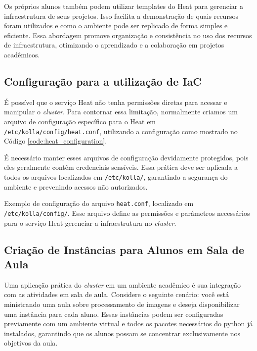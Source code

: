 Os próprios alunos também podem utilizar templates do Heat para gerenciar a infraestrutura de seus projetos. Isso facilita a demonstração de quais recursos foram utilizados e como o ambiente pode ser replicado de forma simples e eficiente. Essa abordagem promove organização e consistência no uso dos recursos de infraestrutura, otimizando o aprendizado e a colaboração em projetos acadêmicos.

\subsection{Configuração para a utilização de IaC}
É possível que o serviço Heat não tenha permissões diretas para acessar e manipular o \textit{cluster}. Para contornar essa limitação, normalmente criamos um arquivo de configuração específico para o Heat em \texttt{/etc/kolla/config/heat.conf}, utilizando a configuração como mostrado no Código \ref{code:heat_configuration}.

É necessário manter esses arquivos de configuração devidamente protegidos, pois eles geralmente contêm credenciais sensíveis. Essa prática deve ser aplicada a todos os arquivos localizados em \texttt{/etc/kolla/}, garantindo a segurança do ambiente e prevenindo acessos não autorizados.


\begin{listing}[h!]
    \noindent{}  
  \caption{Exemplo de configuração do arquivo \texttt{heat.conf}, localizado em \texttt{/etc/kolla/config/}. Esse arquivo define as permissões e parâmetros necessários para o serviço Heat gerenciar a infraestrutura no \textit{cluster}.}
  \label{code:heat_configuration}
\end{listing}


\subsection{Criação de Instâncias para Alunos em Sala de Aula}

Uma aplicação prática do \textit{cluster} em um ambiente acadêmico é sua integração com as atividades em sala de aula. Considere o seguinte cenário: você está ministrando uma aula sobre processamento de imagens e deseja disponibilizar uma instância para cada aluno. Essas instâncias podem ser configuradas previamente com um ambiente virtual e todos os pacotes necessários do python já instalados, garantindo que os alunos possam se concentrar exclusivamente nos objetivos da aula.

